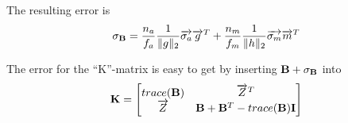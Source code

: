 The resulting error is 
\begin{equation}
\mathbf{\sigma_B} = \frac{n_a}{f_a} \frac{1}{\Vert{g}\Vert_2} \overrightarrow{\sigma_a}\overrightarrow{g}^{T} + \frac{n_m}{f_m} \frac{1}{\Vert{h}\Vert_2} \overrightarrow{\sigma_m}\overrightarrow{m}^{T}
\end{equation}

The error for the ``K''-matrix is easy to get by inserting $ \mathbf{B} + \mathbf{\sigma_B} $ into
\begin{equation}
\mathbf{K} = \begin{bmatrix}
trace(\mathbf{B}) & \overrightarrow{Z}^{T} \\
\overrightarrow{Z} & \mathbf{B} + \mathbf{B}^{T} - trace(\mathbf{B}) \mathbf{I}
\end{bmatrix}
\end{equation}











